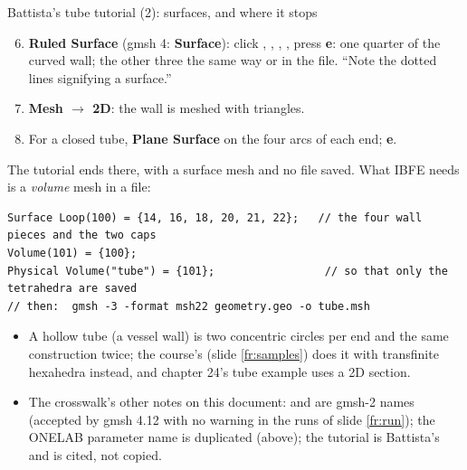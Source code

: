 \documentclass[aspectratio=169,11pt]{beamer}
\begin{document}
\begin{frame}[fragile]{Battista's tube tutorial (2): surfaces, and where it stops}
\label{fr:battista2}
\footnotesize
\begin{enumerate}
  \setcounter{enumi}{5}
  \item \textbf{Ruled Surface} (gmsh 4: \textbf{Surface}): click , , , , press \textbf{e}: one quarter of the curved wall; the other three the same way or in the file. ``Note the dotted lines signifying a surface.''
  \item \textbf{Mesh $\to$ 2D}: the wall is meshed with triangles.
  \item For a closed tube, \textbf{Plane Surface} on the four arcs of each end; \textbf{e}.
\end{enumerate}
The tutorial ends there, with a surface mesh and no file saved. What IBFE needs is a \emph{volume} mesh in a file:
\begin{lstlisting}[style=geotiny]
Surface Loop(100) = {14, 16, 18, 20, 21, 22};   // the four wall pieces and the two caps
Volume(101) = {100};
Physical Volume("tube") = {101};                 // so that only the tetrahedra are saved
// then:  gmsh -3 -format msh22 geometry.geo -o tube.msh
\end{lstlisting}
\begin{itemize}
  \item A hollow tube (a vessel wall) is two concentric circles per end and the same construction twice; the course's  (slide \ref{fr:samples}) does it with transfinite hexahedra instead, and chapter 24's tube example uses a 2D section.
  \item The crosswalk's other notes on this document:  and  are gmsh-2 names (accepted by gmsh 4.12 with no warning in the runs of slide \ref{fr:run}); the ONELAB parameter name is duplicated (above); the tutorial is Battista's and is cited, not copied.
\end{itemize}
\end{frame}
\end{document}
